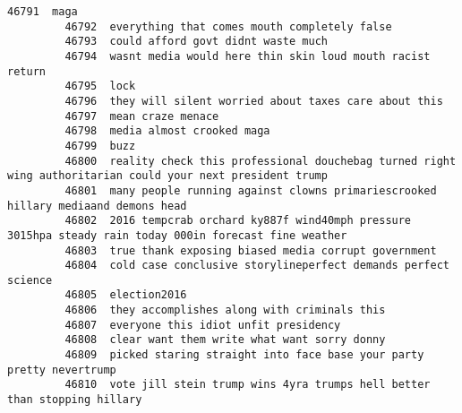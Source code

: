 \documentclass[11pt]{article}
\begin{document}
\begin{Verbatim}[commandchars=\\\{\}]
         46791  maga                                                                                                        
         46792  everything that comes mouth completely false                                                                
         46793  could afford govt didnt waste much                                                                          
         46794  wasnt media would here thin skin loud mouth racist return                                                   
         46795  lock                                                                                                        
         46796  they will silent worried about taxes care about this                                                        
         46797  mean craze menace                                                                                           
         46798  media almost crooked maga                                                                                   
         46799  buzz                                                                                                        
         46800  reality check this professional douchebag turned right wing authoritarian could your next president trump   
         46801  many people running against clowns primariescrooked hillary mediaand demons head                            
         46802  2016 tempcrab orchard ky887f wind40mph pressure 3015hpa steady rain today 000in forecast fine weather       
         46803  true thank exposing biased media corrupt government                                                         
         46804  cold case conclusive storylineperfect demands perfect science                                               
         46805  election2016                                                                                                
         46806  they accomplishes along with criminals this                                                                 
         46807  everyone this idiot unfit presidency                                                                        
         46808  clear want them write what want sorry donny                                                                 
         46809  picked staring straight into face base your party pretty nevertrump                                         
         46810  vote jill stein trump wins 4yra trumps hell better than stopping hillary                                    
         

\end{Verbatim}
\end{document}
